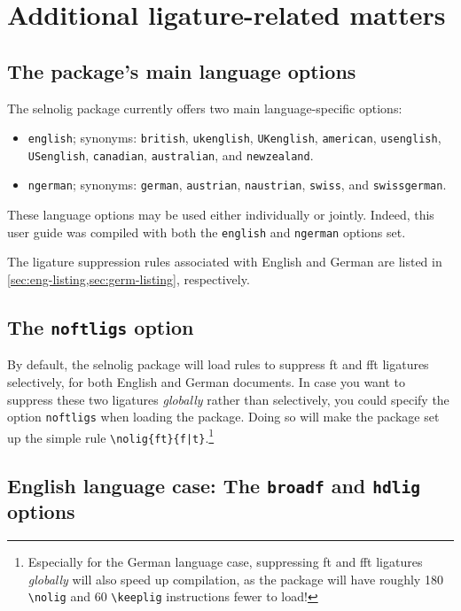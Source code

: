 \documentclass[11pt]{article}
\newcommand{\pkg}[1]{\textsf{#1}}
\newcommand{\opt}[1]{\texttt{#1}}
\newcommand{\cmmd}[1]{\texttt{\textbackslash #1}}
\begin{document}
\section{Additional ligature-related matters}
\label{sec:options}


\subsection{The package's main language options}

The \pkg{selnolig} package currently offers two main language-specific options: 
\begin{itemize}
\item \opt{english}; synonyms: \opt{british}, \opt{ukenglish}, \opt{UKenglish}, \opt{amer\-ican}, \opt{usenglish}, \opt{USenglish}, \opt{cana\-dian}, \opt{australian}, and \opt{new\-zealand}.
\item \opt{ngerman}; synonyms: \opt{german}, \opt{austrian}, \opt{naustrian}, \opt{swiss}, and \opt{swiss\-german}.
\end{itemize}
These language options may be used either individually or jointly. Indeed, this user guide was compiled with both the \opt{english} and \opt{ngerman} options set.

The ligature suppression rules associated with English and German are listed in \cref{sec:eng-listing,sec:germ-listing}, respectively.


\subsection{The \opt{noftligs} option}

By default, the \pkg{selnolig} package will load rules to suppress ft and fft ligatures selectively, for both English and German documents. In case you want to suppress these two ligatures \emph{globally} rather than selectively, you could specify the option \opt{noftligs} when loading the package. Doing so will make the package set up the simple rule \Verb+\nolig{ft}{f|t}+.\footnote{Especially for the German language case, suppressing ft and fft ligatures \emph{globally} will also speed up compilation, as the package will have roughly 180 \cmmd{nolig} and 60 \cmmd{keeplig} instructions fewer to load!}



\subsection[English language case: The broadf and hdlig options]{English language case: The \opt{broadf} and \opt{hdlig} options} \label{sec:eng-opt}
\end{document}
